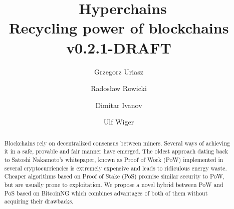 \documentclass{article}
\title{\huge \Aet\ Hyperchains \\[0.5em]
  \large Recycling power of blockchains
  \\[1em] v0.2.1-DRAFT }
\author{ Grzegorz Uriasz
  \and Radosław Rowicki
  \and Dimitar Ivanov
  \and Ulf Wiger
}
\begin{document}
\maketitle

\begin{abstract}
  Blockchains rely on decentralized consensus between miners. Several ways of
  achieving it in a safe, provable and fair manner have emerged. The oldest
  approach dating back to Satoshi Nakamoto's whitepaper, known as Proof of Work
  (PoW) implemented in several cryptocurriencies is extremely expensive and
  leads to ridiculous energy waste. Cheaper algorithms based on Proof of Stake (PoS)
  promise similar security to PoW, but are usually prone to exploitation. We
  propose a novel hybrid between PoW and PoS based on BitcoinNG which combines
  advantages of both of them without acquiring their drawbacks.
\end{abstract}

\tableofcontents

\newpage









 
\end{document}
